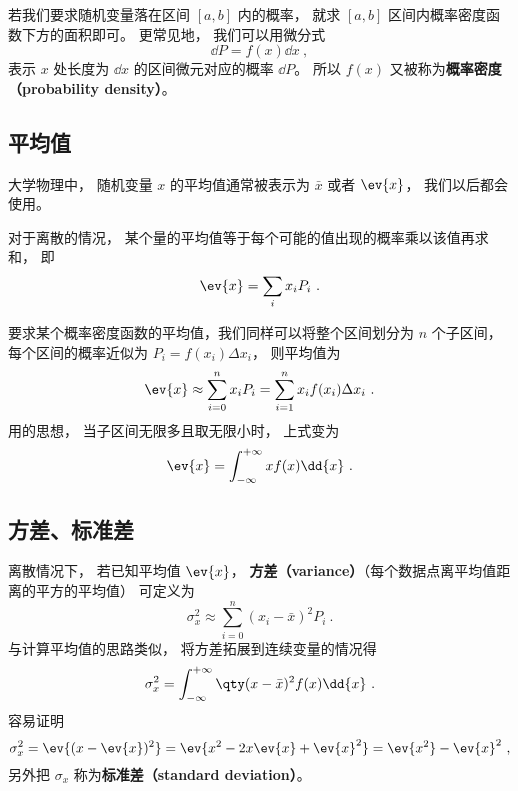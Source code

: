 若我们要求随机变量落在区间 $[a,b]$ 内的概率， 就求 $[a,b]$ 区间内概率密度函数下方的面积即可。 更常见地， 我们可以用微分式
\begin{equation}
\dd{P} = f(x) \dd{x}~,
\end{equation}
表示 $x$ 处长度为 $\dd{x}$ 的区间微元对应的概率 $\dd{P}$。 所以 $f(x)$ 又被称为\textbf{概率密度（probability density）}。

\subsection{平均值}
大学物理中， 随机变量 $x$ 的平均值通常被表示为 $\bar x$ 或者 $\ev{x}$， 我们以后都会使用。

对于离散的情况， 某个量的平均值等于每个可能的值出现的概率乘以该值再求和， 即
\begin{equation}\label{eq_RandF_14}
\ev{x} = \sum_i x_i P_i~.
\end{equation}

要求某个概率密度函数的平均值，我们同样可以将整个区间划分为 $n$ 个子区间， 每个区间的概率近似为 $P_i = f(x_i) \Delta x_i$， 则平均值为
\begin{equation}
\ev{x} \approx \sum_{i=0}^n x_i P_i = \sum_{i=1}^n x_i f(x_i) \Delta x_i~.
\end{equation}
用的思想， 当子区间无限多且取无限小时， 上式变为
\begin{equation}\label{eq_RandF_7}
\ev{x} = \int_{-\infty}^{+\infty} x f(x) \dd{x}~.
\end{equation}

\subsection{方差、标准差}
离散情况下， 若已知平均值 $\ev{x}$， \textbf{方差（variance）}（每个数据点离平均值距离的平方的平均值） 可定义为
\begin{equation}
\sigma_x^2 \approx \sum_{i=0}^n (x_i - \bar x)^2 P_i~.
\end{equation}
与计算平均值的思路类似， 将方差拓展到连续变量的情况得
\begin{equation}\label{eq_RandF_6}
\sigma_x^2 = \int_{-\infty}^{+\infty} \qty(x-\bar x)^2 f(x) \dd{x}~.
\end{equation}
容易证明
\begin{equation}\label{eq_RandF_15}
\sigma_x^2=\ev{(x-\ev{x})^2}=\ev{x^2-2x\ev{x}+\ev{x}^2}=\ev{x^2}-\ev{x}^2~,
\end{equation}
另外把 $\sigma_x$ 称为\textbf{标准差（standard deviation）}。

